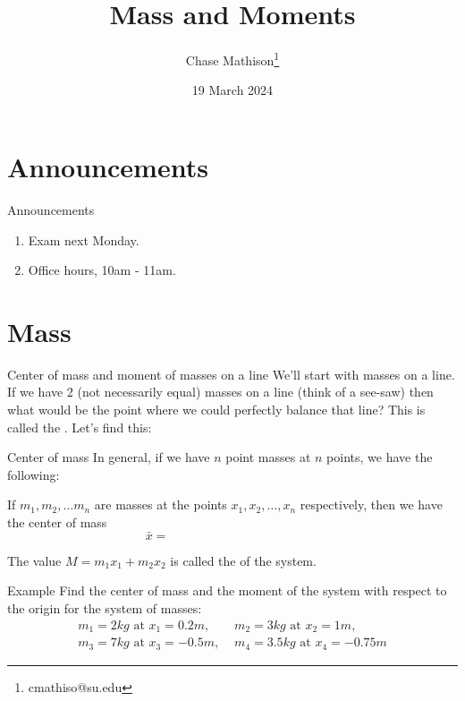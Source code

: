 \documentclass[presentation]{beamer}
\institute[SU]{Shenandoah University}
\author{Chase Mathison\thanks{cmathiso@su.edu}}
\date{19 March 2024}
\title{Mass and Moments}
\begin{document}
\maketitle

\section{Announcements}
\label{sec:orge0dfb24}
\begin{frame}[label={sec:org1be8bd4}]{Announcements}
\begin{enumerate}
\item Exam next Monday.
\item Office hours, 10am - 11am.
\end{enumerate}
\end{frame}

\section{Mass}
\label{sec:orgb7507e5}
\begin{frame}[label={sec:orgee8ac2e}]{Center of mass and moment of masses on a line}
We'll start with masses on a line.  If we have 2 (not necessarily
equal) masses on a line (think of a see-saw) then what would be the
point where we could perfectly balance that line?  This is called the
\uline{\hspace*{1in}}. Let's find this: 
\vspace{10in}
\end{frame}

\begin{frame}[label={sec:orgb0eea70}]{Center of mass}
In general, if we have \(n\) point masses at \(n\) points, we have the
following:
\begin{theorem}
If \(m_1, m_2,\ldots m_n\) are masses at the points \(x_1,x_2,\ldots, x_n\) respectively, then we have the center of mass
\[
\bar{x} = \hspace{2in}\]

The value \(M = m_1x_1 + m_2x_2\) is called the \uline{\hspace*{1in}} of the system.
\end{theorem}
\end{frame}

\begin{frame}[label={sec:org1b81698}]{Example}
Find the center of mass and the moment of the system with respect to
the origin for the system of masses:
\begin{align*}
m_1 = 2 kg \text{ at } x_1 = 0.2 m, \,\,& m_2 = 3 kg \text{ at } x_2 = 1 m, \\
m_3 = 7 kg \text{ at } x_3 = -0.5 m, \,\,& m_4 = 3.5 kg \text{ at } x_4 = -0.75 m
\end{align*}
\vspace{10in}
\end{frame}
\end{document}

